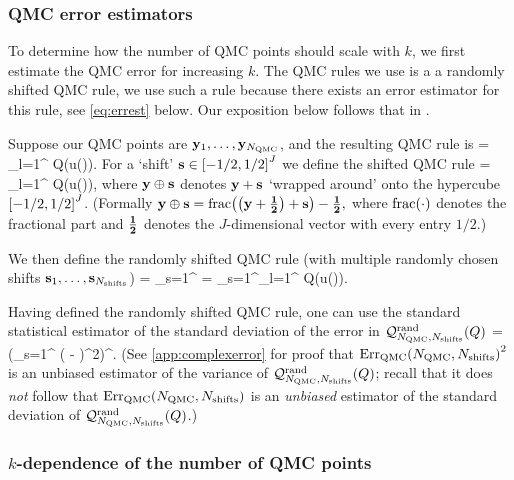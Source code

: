 \subsubsection{QMC error estimators}
    
    To determine how the number of QMC points should scale with $k$, we first estimate the QMC error for increasing $k.$ The QMC rules we use is a a randomly shifted QMC rule, we use such a rule because there exists an error estimator for this rule, see \cref{eq:errest} below. Our exposition below follows that in \cite[Section 4.2]{GrKuNuScSl:11}.

    Suppose our QMC points are $\mathbf{y}_{1},\ldots,\mathbf{y}_{N_{\mathrm{QMC}}}$, and the resulting QMC rule is
    \beqs
{} = \sum_{l=1}^{\NQMC} Q\mleft(u\mleft(\byl\mright)\mright).
\eeqs
For a `shift' $\shift \in \cube{J}$ we define the shifted QMC rule
\beqs
{} = \sum_{l=1}^{\NQMC} Q\mleft(u\mleft(\byl\oplus\shift\mright)\mright),
\eeqs
where $\mathbf{y} \oplus \mathbf{s}$ denotes $\mathbf{y} + \mathbf{s}$ `wrapped around' onto the hypercube $\cube{J}$. (Formally $\by \oplus \shift = \fracoperator{\mleft(\by + \bhalf\mright)+\shift} - \bhalf,$ where $\fracoperator{\cdot}$ denotes the fractional part and $\mathbf{\frac{1}{2}}$ denotes the $J$-dimensional vector with every entry $1/2.$)

We then define the randomly shifted QMC rule (with multiple randomly chosen shifts $\mathbf{s}_{1},\ldots,\mathbf{s}_{N_{\mathrm{shifts}}}$)
\beqs
{} = \sum_{s=1}^{\Nshifts}  = \sum_{s=1}^{\Nshifts}\sum_{l=1}^{\NQMC} Q\mleft(u\mleft(\byl\oplus \shifts\mright)\mright).
\eeqs

Having defined the randomly shifted QMC rule, one can use the standard statistical estimator of the standard deviation of the error in $\QMCrandshift{Q}{\Nshifts}$ \cite[Equation (4.6)]{GrKuNuScSl:11}
\beq\label{eq:errest}
\QMCerror{\NQMC}{\Nshifts} = \mleft(\sum_{s=1}^{\Nshifts} \mleft( - \mright)^2\mright)^{\half}.
\eeq
(See \cref{app:complexerror} for proof that $\QMCerror{\NQMC}{\Nshifts}^2$ is an unbiased estimator of the variance of $\QMCrandshift{Q}{\Nshifts}$; recall that it does \emph{not} follow that $\QMCerror{\NQMC}{\Nshifts}$ is an \emph{unbiased} estimator of the standard deviation of $\QMCrandshift{Q}{\Nshifts}$.)

\subsubsection{$k$-dependence of the number of QMC points}


